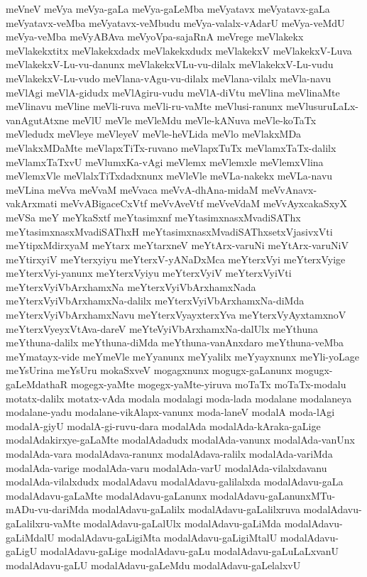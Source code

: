 {meVneV
meVya
meVya-gaLa
meVya-gaLeMba
meVyatavx
meVyatavx-gaLa
meVyatavx-veMba
meVyatavx-veMbudu
meVya-valalx-vAdarU
meVya-veMdU
meVya-veMba
meVyABAva
meVyoVpa-sajaRnA
meVrege
meVlakekx
meVlakekxtitx
meVlakekxdadx
meVlakekxdudx
meVlakekxV
meVlakekxV-Luva
meVlakekxV-Lu-vu-danunx
meVlakekxVLu-vu-dilalx
meVlakekxV-Lu-vudu
meVlakekxV-Lu-vudo
meVlana-vAgu-vu-dilalx
meVlana-vilalx
meVla-navu
meVlAgi
meVlA-gidudx
meVlAgiru-vudu
meVlA-diVtu
meVlina
meVlinaMte
meVlinavu
meVline
meVli-ruva
meVli-ru-vaMte
meVlusi-ranunx
meVlusuruLaLx-vanAgutAtxne
meVlU
meVle
meVleMdu
meVle-kANuva
meVle-koTaTx
meVledudx
meVleye
meVleyeV
meVle-heVLida
meVlo
meVlakxMDa
meVlakxMDaMte
meVlapxTiTx-ruvano
meVlapxTuTx
meVlamxTaTx-dalilx
meVlamxTaTxvU
meVlumxKa-vAgi
meVlemx
meVlemxle
meVlemxVlina
meVlemxVle
meVlalxTiTxdadxnunx
meVleVle
meVLa-nakekx
meVLa-navu
meVLina
meVva
meVvaM
meVvaca
meVvA-dhAna-midaM
meVvAnavx-vakArxmati
meVvABigaceCxVtf
meVvAveVtf
meVveVdaM
meVvAyxcakaSxyX
meVSa
meY
meYkaSxtf
meYtasimxnf
meYtasimxnasxMvadiSAThx
meYtasimxnasxMvadiSAThxH
meYtasimxnasxMvadiSAThxsetxVjasivxVti
meYtipxMdirxyaM
meYtarx
meYtarxneV
meYtArx-varuNi
meYtArx-varuNiV
meYtirxyiV
meYterxyiyu
meYterxV-yANaDxMca
meYterxVyi
meYterxVyige
meYterxVyi-yanunx
meYterxVyiyu
meYterxVyiV
meYterxVyiVti
meYterxVyiVbArxhamxNa
meYterxVyiVbArxhamxNada
meYterxVyiVbArxhamxNa-dalilx
meYterxVyiVbArxhamxNa-diMda
meYterxVyiVbArxhamxNavu
meYterxVyayxterxYva
meYterxVyAyxtamxnoV
meYterxVyeyxVtAva-dareV
meYteVyiVbArxhamxNa-dalUlx
meYthuna
meYthuna-dalilx
meYthuna-diMda
meYthuna-vanAnxdaro
meYthuna-veMba
meYmatayx-vide
meYmeVle
meYyanunx
meYyalilx
meYyayxnunx
meYli-yoLage
meYsUrina
meYsUru
mokaSxveV
mogagxnunx
mogugx-gaLanunx
mogugx-gaLeMdathaR
mogegx-yaMte
mogegx-yaMte-yiruva
moTaTx
moTaTx-modalu
motatx-dalilx
motatx-vAda
modala
modalagi
moda-lada
modalane
modalaneya
modalane-yadu
modalane-vikAlapx-vanunx
moda-laneV
modalA
moda-lAgi
modalA-giyU
modalA-gi-ruvu-dara
modalAda
modalAda-kAraka-gaLige
modalAdakirxye-gaLaMte
modalAdadudx
modalAda-vanunx
modalAda-vanUnx
modalAda-vara
modalAdava-ranunx
modalAdava-ralilx
modalAda-variMda
modalAda-varige
modalAda-varu
modalAda-varU
modalAda-vilalxdavanu
modalAda-vilalxdudx
modalAdavu
modalAdavu-galilalxda
modalAdavu-gaLa
modalAdavu-gaLaMte
modalAdavu-gaLanunx
modalAdavu-gaLanunxMTu-mADu-vu-dariMda
modalAdavu-gaLalilx
modalAdavu-gaLalilxruva
modalAdavu-gaLalilxru-vaMte
modalAdavu-gaLalUlx
modalAdavu-gaLiMda
modalAdavu-gaLiMdalU
modalAdavu-gaLigiMta
modalAdavu-gaLigiMtalU
modalAdavu-gaLigU
modalAdavu-gaLige
modalAdavu-gaLu
modalAdavu-gaLuLaLxvanU
modalAdavu-gaLU
modalAdavu-gaLeMdu
modalAdavu-gaLelalxvU
}
